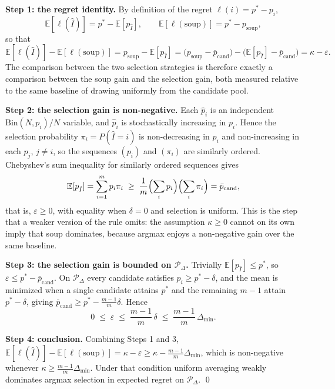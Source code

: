 \documentclass[pdflatex,sn-mathphys-ay,oneside]{sn-jnl}
\theoremstyle{thmstylethree}
\begin{document}
\medskip
\noindent\textbf{Step 1: the regret identity.} By definition of the regret $\ell(i) = p^* - p_i$,
\[
\mathbb{E}[\ell(\hat I)] = p^* - \mathbb{E}[p_{\hat I}], \qquad \mathbb{E}[\ell(\mathrm{soup})] = p^* - p_{\mathrm{soup}},
\]
so that
\[
\mathbb{E}[\ell(\hat I)] - \mathbb{E}[\ell(\mathrm{soup})]
= p_{\mathrm{soup}} - \mathbb{E}[p_{\hat I}]
= \bigl(p_{\mathrm{soup}} - \bar p_{\mathrm{cand}}\bigr) - \bigl(\mathbb{E}[p_{\hat I}] - \bar p_{\mathrm{cand}}\bigr)
= \kappa - \varepsilon .
\]
The comparison between the two selection strategies is therefore exactly a comparison between the soup gain and the selection gain, both measured relative to the same baseline of drawing uniformly from the candidate pool.

\medskip
\noindent\textbf{Step 2: the selection gain is non-negative.} Each $\hat p_i$ is an independent $\mathrm{Bin}(N,p_i)/N$ variable, and $\hat p_i$ is stochastically increasing in $p_i$. Hence the selection probability $\pi_i = P(\hat I = i)$ is non-decreasing in $p_i$ and non-increasing in each $p_j$, $j\neq i$, so the sequences $(p_i)$ and $(\pi_i)$ are similarly ordered. Chebyshev's sum inequality for similarly ordered sequences gives
\[
\mathbb{E}[p_{\hat I}] = \sum_{i=1}^m p_i \pi_i \;\geq\; \frac{1}{m}\Bigl(\sum_i p_i\Bigr)\Bigl(\sum_i \pi_i\Bigr) = \bar p_{\mathrm{cand}},
\]
that is, $\varepsilon \geq 0$, with equality when $\delta = 0$ and selection is uniform. This is the step that a weaker version of the rule omits: the assumption $\kappa\geq0$ cannot on its own imply that soup dominates, because argmax enjoys a non-negative gain over the same baseline.

\medskip
\noindent\textbf{Step 3: the selection gain is bounded on $\mathcal{P}_\Delta$.} Trivially $\mathbb{E}[p_{\hat I}] \leq p^*$, so $\varepsilon \leq p^* - \bar p_{\mathrm{cand}}$. On $\mathcal{P}_\Delta$ every candidate satisfies $p_i \geq p^* - \delta$, and the mean is minimized when a single candidate attains $p^*$ and the remaining $m-1$ attain $p^*-\delta$, giving $\bar p_{\mathrm{cand}} \geq p^* - \frac{m-1}{m}\delta$. Hence
\[
0 \;\leq\; \varepsilon \;\leq\; \frac{m-1}{m}\,\delta \;\leq\; \frac{m-1}{m}\,\Delta_{\min}.
\]

\medskip
\noindent\textbf{Step 4: conclusion.} Combining Steps 1 and 3, $\mathbb{E}[\ell(\hat I)] - \mathbb{E}[\ell(\mathrm{soup})] = \kappa - \varepsilon \geq \kappa - \frac{m-1}{m}\Delta_{\min}$, which is non-negative whenever $\kappa \geq \frac{m-1}{m}\Delta_{\min}$. Under that condition uniform averaging weakly dominates argmax selection in expected regret on $\mathcal{P}_\Delta$. \qed
\end{document}
